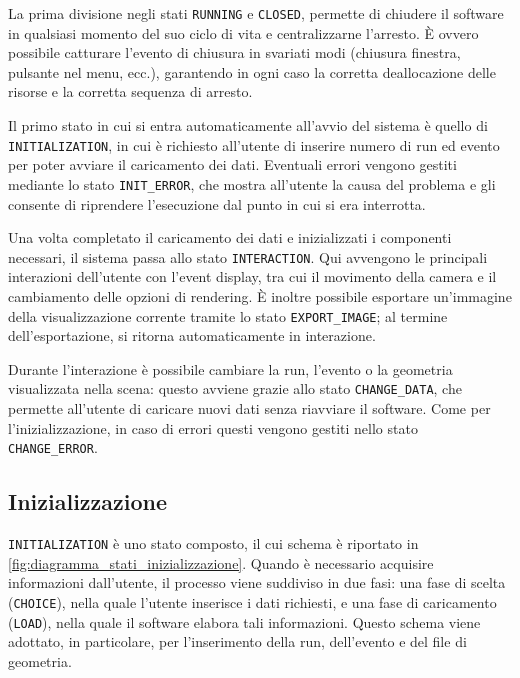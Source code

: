 La prima divisione negli stati \texttt{RUNNING} e \texttt{CLOSED}, permette di chiudere il software in qualsiasi momento del suo ciclo di vita e centralizzarne l'arresto.
È ovvero possibile catturare l'evento di chiusura in svariati modi (chiusura finestra, pulsante nel menu, ecc.), garantendo in ogni caso la corretta deallocazione delle risorse e la corretta sequenza di arresto.

Il primo stato in cui si entra automaticamente all'avvio del sistema è quello di \texttt{INITIALIZATION}, in cui è richiesto all'utente di inserire numero di run ed evento per poter avviare il caricamento dei dati.
Eventuali errori vengono gestiti mediante lo stato \texttt{INIT\_ERROR}, che mostra all’utente la causa del problema e gli consente di riprendere l’esecuzione dal punto in cui si era interrotta.

Una volta completato il caricamento dei dati e inizializzati i componenti necessari, il sistema passa allo stato \texttt{INTERACTION}.
Qui avvengono le principali interazioni dell'utente con l'event display, tra cui il movimento della camera e il cambiamento delle opzioni di rendering.
È inoltre possibile esportare un’immagine della visualizzazione corrente tramite lo stato \texttt{EXPORT\_IMAGE}; al termine dell'esportazione, si ritorna automaticamente in interazione.

Durante l'interazione è possibile cambiare la run, l'evento o la geometria visualizzata nella scena: questo avviene grazie allo stato \texttt{CHANGE\_DATA}, che permette all'utente di caricare nuovi dati senza riavviare il software.
Come per l'inizializzazione, in caso di errori questi vengono gestiti nello stato \texttt{CHANGE\_ERROR}.

\subsection{Inizializzazione}

\texttt{INITIALIZATION} è uno stato composto, il cui schema è riportato in \cref{fig:diagramma_stati_inizializzazione}.
Quando è necessario acquisire informazioni dall’utente, il processo viene suddiviso in due fasi: una fase di scelta (\texttt{CHOICE}), nella quale l’utente inserisce i dati richiesti, e una fase di caricamento (\texttt{LOAD}), nella quale il software elabora tali informazioni.
Questo schema viene adottato, in particolare, per l’inserimento della run, dell’evento e del file di geometria.

